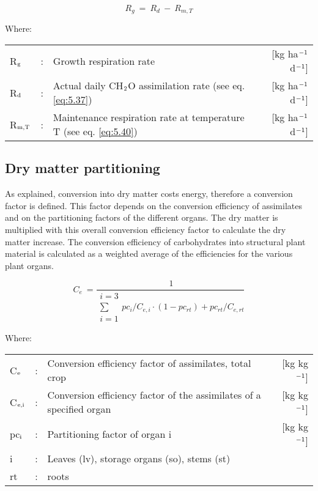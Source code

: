 \begin{equation}
\label{eq:5.41}
R _{g} ~=~ R _{d} ~-~ R _{m,T} 
\end{equation}

Where:\\[5pt]
\begin{tabularx}{\textwidth}{llXr}
R$_{{\rm g}}$ &:& Growth respiration rate   &     [kg ha$^{{\rm -1}}$ d$^{{\rm -1}}$]\\
R$_{{\rm d}}$ &:& Actual daily CH$_{{\rm 2}}$O assimilation rate (see eq. \ref{eq:5.37})   &   
    [kg ha$^{{\rm -1}}$ d$^{{\rm -1}}$]\\
R$_{{\rm m,T}}$ &:& Maintenance respiration rate at 
    temperature T (see eq. \ref{eq:5.40})   &     [kg ha$^{{\rm -1}}$ d$^{{\rm -1}}$]\\
\end{tabularx}

\subsection{Dry matter partitioning  }
\label{sec:DMpartitioning}

As explained, conversion into dry matter costs energy, therefore a conversion factor is
defined. This factor depends on the conversion efficiency of assimilates and on the
partitioning factors of the different organs. The dry matter is multiplied with this overall
conversion efficiency factor to calculate the dry matter increase. The conversion 
efficiency of carbohydrates into structural plant material is calculated as a weighted average
of the efficiencies for the various plant organs.

\begin{equation}
\label{eq:5.42}
C _{e} ~={\frac{~1}{
        \begin{array}{c}
        {i=3}  \\
        \sum  \\
        {i=1}
        \end{array} {pc_{i}}/{C_{e,i}} \cdot (1-pc_{rt} ) + {pc_{rt}}/{C_{e,rt}} 
        }}
\end{equation}

Where:\\[5pt]
\begin{tabularx}{\textwidth}{llXr}
C$_{{\rm e}}$ &:& Conversion efficiency factor of assimilates, total crop  &   
    [kg kg$^{{\rm -1}}$]\\
C$_{{\rm e,i}}$ &:& Conversion efficiency factor of the assimilates 
    of a specified organ  &      [kg kg$^{{\rm -1}}$]\\
pc$_{{\rm i}}$ &:& Partitioning factor of organ i   &
     [kg kg$^{{\rm -1}}$]\\
i &:& Leaves (lv), storage organs (so), stems (st)\\
rt &:& roots\\
\end{tabularx}


